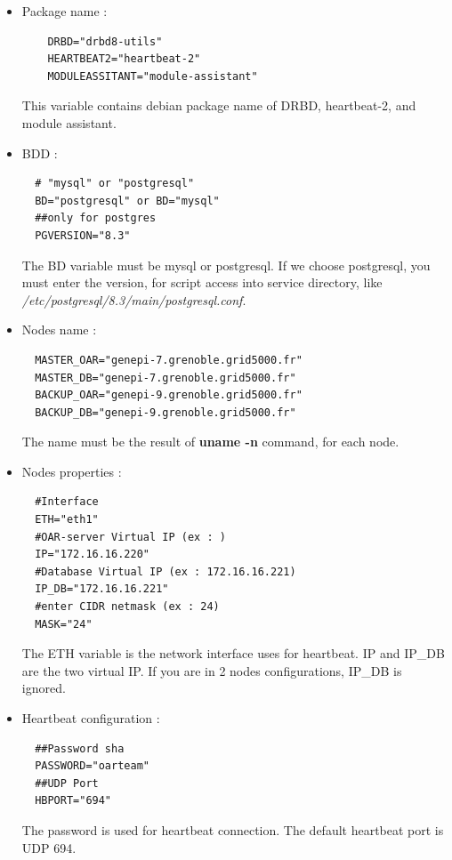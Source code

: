 \documentclass[a4paper,10pt]{report}
\begin{document}
\begin{itemize}
 \item Package name :\\
    \begin{lstlisting}
    DRBD="drbd8-utils"
    HEARTBEAT2="heartbeat-2"
    MODULEASSITANT="module-assistant"
    \end{lstlisting}
  This variable contains debian package name of DRBD, heartbeat-2, and module assistant.

 \item BDD :\\
  \begin{lstlisting}
  # "mysql" or "postgresql"
  BD="postgresql" or BD="mysql"
  ##only for postgres
  PGVERSION="8.3"
  \end{lstlisting}
The BD variable must be mysql or postgresql. If we choose postgresql, you must enter the version, for script access into service directory, like \textit{/etc/postgresql/8.3/main/postgresql.conf}.

 \item Nodes name :\\
  \begin{lstlisting}
  MASTER_OAR="genepi-7.grenoble.grid5000.fr"
  MASTER_DB="genepi-7.grenoble.grid5000.fr"
  BACKUP_OAR="genepi-9.grenoble.grid5000.fr"
  BACKUP_DB="genepi-9.grenoble.grid5000.fr"
  \end{lstlisting}
The name must be the result of \textbf{uname -n} command, for each node.

  \item Nodes properties :\\
  \begin{lstlisting}
  #Interface
  ETH="eth1"
  #OAR-server Virtual IP (ex : )
  IP="172.16.16.220"
  #Database Virtual IP (ex : 172.16.16.221)
  IP_DB="172.16.16.221"
  #enter CIDR netmask (ex : 24)
  MASK="24"
  \end{lstlisting}
The ETH variable is the network interface uses for heartbeat. IP and IP\_DB are the two virtual IP. If you are in 2 nodes configurations, IP\_DB is ignored.

  \item Heartbeat configuration :\\
  \begin{lstlisting}
  ##Password sha
  PASSWORD="oarteam"
  ##UDP Port
  HBPORT="694"
  \end{lstlisting}
The password is used for heartbeat connection. The default heartbeat port is UDP 694.


\end{itemize}
\end{document}
